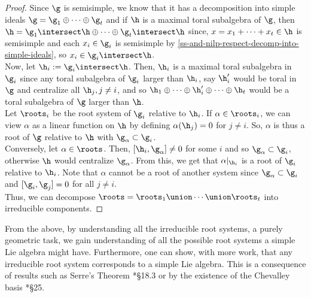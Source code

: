 \documentclass[11pt,leqno,oneside]{amsart}
\numberwithin{thm}{section}
\begin{document}
\begin{proof}
  Since \(\g\) is semisimple, we know that it has a decomposition into
  simple ideals \(\g = \g_1 \oplus \cdots \oplus \g_t\) and if \(\h\)
  is a maximal toral subalgebra of \(\g\), then \(\h = \g_1
  \intersect \h \oplus \cdots \oplus \g_t \intersect \h\) since, \(x =
  x_1 + \cdots + x_t \in \h\) is 
  semisimple and each \(x_i \in \g_i\) is semisimple by \ref{ss-and-nilp-respect-decomp-into-simple-ideals}, so
  \(x_i \in \g_i \intersect \h\). \\

  Now, let \(\h_i := \g_i \intersect \h\). Then, \(\h_i\) is a maximal
  toral subalgebra in \(\g_i\) since any toral subalgebra of \(\g_i\)
  larger than \(\h_i\), say \(\h_i'\) would be toral in \(\g\) and
  centralize all 
  \(\h_j, j \neq i\), and so \(\h_1 \oplus \cdots \oplus \h_i' \oplus
  \cdots \oplus \h_t\) would be a toral subalgebra of \(\g\) larger
  than \(\h\). \\

  Let \(\roots_i\) be the root system of \(\g_i\) relative to
  \(\h_i\). If \(\alpha \in \roots_i\), we can view \(\alpha\) as a
  linear function on \(\h\) by defining \(\alpha(\h_j) = 0\) for \(j
  \neq i\). So, \(\alpha\) is thus a root of \(\g\) relative to \(\h\)
  with \(\g_\alpha \subset \g_i\). \\

  Conversely, let \(\alpha \in
  \roots\). Then, \([\h_i, \g_\alpha] \neq 0\) for some \(i\) and so
  \(\g_\alpha \subset \g_i\), otherwise \(\h\) would centralize
  \(\g_\alpha\). From this, we get that 
  \(\alpha|_{\h_i}\) is a root of \(\g_i\) relative to
  \(\h_i\). Note that \(\alpha\) cannot be a root of another system
  since \(\g_\alpha \subset \g_i\) and \([\g_i, \g_j] = 0\) for all
  \(j \neq i\). \\

  Thus, we can decompose \(\roots = \roots_1 \union \cdots \union
  \roots_t\) into irreducible components.
\end{proof}
From the above, by understanding all the irreducible root systems, a purely
geometric task, we gain understanding of all the possible root systems
a simple Lie algebra might have. Furthermore, one can show, with more
work, that any irreducible root system corresponds to a simple Lie
algebra. This is a consequence of results such as Serre's Theorem
\cite{humph}*{\S 18.3} or
by the existence of the Chevalley basis \cite{humph}*{\S 25}. 
\end{document}
